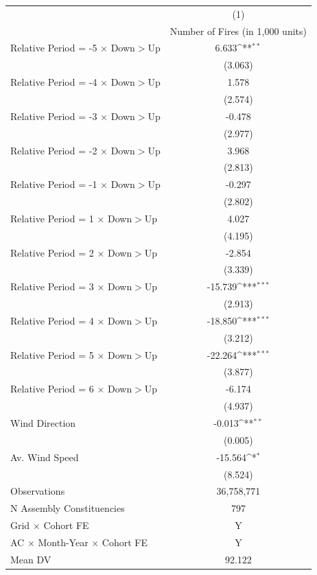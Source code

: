 {
\def\sym#1{\ifmmode^{#1}\else\(^{#1}\)\fi}
\begin{tabular}{l*{1}{c}}
\hline
            & \multicolumn{1}{c}{(1)}             \\
            & \multicolumn{1}{c}{Number of Fires (in 1,000 units)} \\ \hline

Relative Period = -5 $\times$ Down$>$Up&       6.633\sym{**} \\
            &     (3.063)         \\
Relative Period = -4 $\times$ Down$>$Up&       1.578         \\
            &     (2.574)         \\
Relative Period = -3 $\times$ Down$>$Up&      -0.478         \\
            &     (2.977)         \\
Relative Period = -2 $\times$ Down$>$Up&       3.968         \\
            &     (2.813)         \\
Relative Period = -1 $\times$ Down$>$Up&      -0.297         \\
            &     (2.802)         \\
Relative Period = 1 $\times$ Down$>$Up&       4.027         \\
            &     (4.195)         \\
Relative Period = 2 $\times$ Down$>$Up&      -2.854         \\
            &     (3.339)         \\
Relative Period = 3 $\times$ Down$>$Up&     -15.739\sym{***}\\
            &     (2.913)         \\
Relative Period = 4 $\times$ Down$>$Up&     -18.850\sym{***}\\
            &     (3.212)         \\
Relative Period = 5 $\times$ Down$>$Up&     -22.264\sym{***}\\
            &     (3.877)         \\
Relative Period = 6 $\times$ Down$>$Up&      -6.174         \\
            &     (4.937)         \\
Wind Direction&      -0.013\sym{**} \\
            &     (0.005)         \\
Av. Wind Speed&     -15.564\sym{*}  \\
            &     (8.524)         \\
\hline
Observations&  36,758,771         \\
N Assembly Constituencies&         797         \\
Grid $\times$ Cohort FE&           Y         \\
AC $\times$ Month-Year $\times$ Cohort FE&           Y         \\
Mean DV     &      92.122         \\
\hline
\end{tabular}
}
